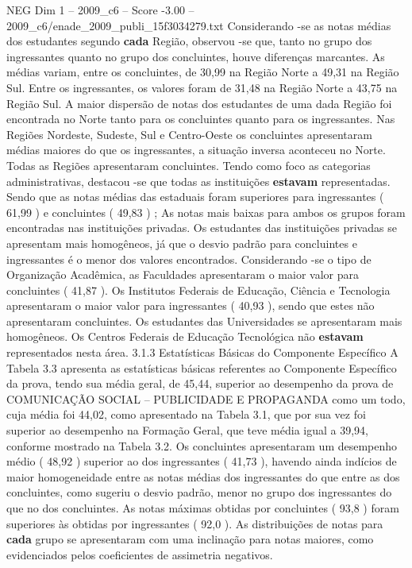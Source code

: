 \begin{textsample}{NEG Dim 1 – 2009\_c6 – Score -3.00 – 2009\_c6/enade\_2009\_publi\_15f3034279.txt}
Considerando -se as notas médias dos estudantes segundo \textbf{cada} Região, observou -se que, tanto no grupo dos ingressantes quanto no grupo dos concluintes, houve diferenças marcantes.
As médias variam, entre os concluintes, de 30,99 na Região Norte a 49,31 na Região Sul.
Entre os ingressantes, os valores foram de 31,48 na Região Norte a 43,75 na Região Sul.
A maior dispersão de notas dos estudantes de uma dada Região foi encontrada no Norte tanto para os concluintes quanto para os ingressantes.
Nas Regiões Nordeste, Sudeste, Sul e Centro-Oeste os concluintes apresentaram médias maiores do que os ingressantes, a situação inversa aconteceu no Norte.
Todas as Regiões apresentaram concluintes.
Tendo como foco as categorias administrativas, destacou -se que todas as instituições \textbf{estavam} representadas.
Sendo que as notas médias das estaduais foram superiores para ingressantes ( 61,99 ) e concluintes ( 49,83 ) ; As notas mais baixas para ambos os grupos foram encontradas nas instituições privadas.
Os estudantes das instituições privadas se apresentam mais homogêneos, já que o desvio padrão para concluintes e ingressantes é o menor dos valores encontrados.
Considerando -se o tipo de Organização Acadêmica, as Faculdades apresentaram o maior valor para concluintes ( 41,87 ).
Os Institutos Federais de Educação, Ciência e Tecnologia apresentaram o maior valor para ingressantes ( 40,93 ), sendo que estes não apresentaram concluintes.
Os estudantes das Universidades se apresentaram mais homogêneos.
Os Centros Federais de Educação Tecnológica não \textbf{estavam} representados nesta área. 3.1.3 Estatísticas Básicas do Componente Específico A Tabela 3.3 apresenta as estatísticas básicas referentes ao Componente Específico da prova, tendo sua média geral, de 45,44, superior ao desempenho da prova de COMUNICAÇÃO SOCIAL – PUBLICIDADE E PROPAGANDA como um todo, cuja média foi 44,02, como apresentado na Tabela 3.1, que por sua vez foi superior ao desempenho na Formação Geral, que teve média igual a 39,94, conforme mostrado na Tabela 3.2.
Os concluintes apresentaram um desempenho médio ( 48,92 ) superior ao dos ingressantes ( 41,73 ), havendo ainda indícios de maior homogeneidade entre as notas médias dos ingressantes do que entre as dos concluintes, como sugeriu o desvio padrão, menor no grupo dos ingressantes do que no dos concluintes.
As notas máximas obtidas por concluintes ( 93,8 ) foram superiores às obtidas por ingressantes ( 92,0 ).
As distribuições de notas para \textbf{cada} grupo se apresentaram com uma inclinação para notas maiores, como evidenciados pelos coeficientes de assimetria negativos.

\end{textsample}
